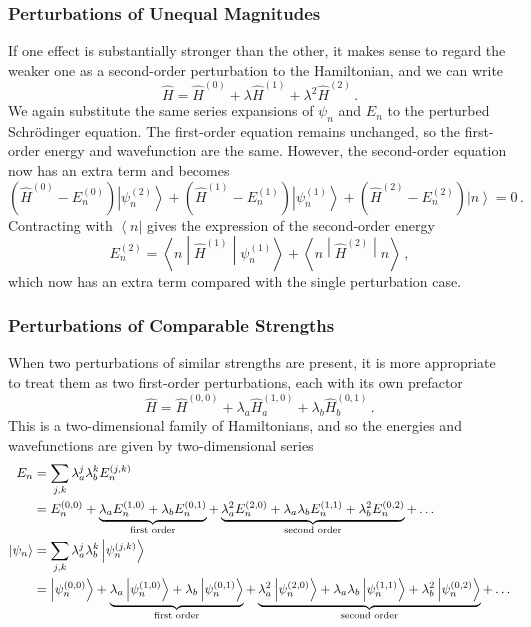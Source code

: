 \documentclass{article}
\theoremstyle{plain}\theoremheaderfont{\normalfont\itshape}\theorembodyfont{\rmfamily}\theoremseparator{.}\newtheorem*{rem}{Remark}\newtheorem*{ex}{Example}\newtheorem*{proof}{Proof}\newtheorem*{altp}{Alternative proof}
\theoremstyle{plain}\theoremheaderfont{\normalfont\bfseries}\theorembodyfont{\rmfamily}\theoremseparator{.}\newtheorem{thm}{Theorem}[section]\newtheorem{lem}[thm]{Lemma}\newtheorem{prop}[thm]{Proposition}\newtheorem*{cor}{Corollary}\newtheorem{defn}[thm]{Definition}\newtheorem{clm}[thm]{Claim}\newtheorem{clminproof}{Claim}
\theoremstyle{break}\theoremheaderfont{\normalfont\itshape}\theorembodyfont{\rmfamily}\theoremseparator{.\medskip}\newtheorem*{proofskip}{Proof}\newtheorem*{exs}{Examples}\newtheorem*{rems}{Remarks}
\theoremstyle{break}\theoremheaderfont{\normalfont\bfseries}\theorembodyfont{\rmfamily}\theoremseparator{.\medskip}\newtheorem{lemskip}[thm]{Lemma}\newtheorem{defnskip}[thm]{Definition}\newtheorem{propskip}[thm]{Proposition}\newtheorem{thmskip}[thm]{Theorem}
\numberwithin{equation}{section}
\newcommand{\bra}[1]{\left\langle #1 \right|}
\newcommand{\ket}[1]{\left| #1 \right\rangle}
\newcommand{\mel}[3]{\left\langle #1 \middle| #2 \middle| #3 \right\rangle}
\newcommand{\expval}[2]{\left\langle #2 \middle| #1 \middle| #2 \right\rangle}
\begin{document}
    \subsubsection{Perturbations of Unequal Magnitudes}
    If one effect is substantially stronger than the other, it makes sense to regard the weaker one as a second-order perturbation to the Hamiltonian, and we can write
    \begin{equation}
        \hat{H}=\hat{H}^{(0)}+\lambda\hat{H}^{(1)}+\lambda^2\hat{H}^{(2)}\,.
    \end{equation}
    We again substitute the same series expansions of \(\psi_n\) and \(E_n\) to the perturbed Schr\"{o}dinger equation. The first-order equation remains unchanged, so the first-order energy and wavefunction are the same. However, the second-order equation now has an extra term and becomes
    \begin{equation}
        (\hat{H}^{(0)}-E_n^{(0)})\ket{\psi_n^{(2)}}+(\hat{H}^{(1)}-E_n^{(1)})\ket{\psi_n^{(1)}}+(\hat{H}^{(2)}-E_n^{(2)})\ket{n}=0\,.
    \end{equation}
    Contracting with \(\bra{n}\) gives the expression of the second-order energy
    \begin{equation}
        E_n^{(2)}=\mel{n}{\hat{H}^{(1)}}{\psi_n^{(1)}}+\expval{\hat{H}^{(2)}}{n}\,,
    \end{equation}
    which now has an extra term compared with the single perturbation case.

    \subsubsection{Perturbations of Comparable Strengths}
    When two perturbations of similar strengths are present, it is more appropriate to treat them as two first-order perturbations, each with its own prefactor
    \begin{equation}
        \hat{H}=\hat{H}^{(0,0)}+\lambda_a\hat{H}_a^{(1,0)}+\lambda_b\hat{H}_b^{(0,1)}\,.
    \end{equation}
    This is a two-dimensional family of Hamiltonians, and so the energies and wavefunctions are given by two-dimensional series
    \begin{align}
        E_n&=\sum_{j,k}\lambda_a^j\lambda_b^k E_n^{(j,k)}\notag \\
        &=E_n^{(0,0)}+\underbrace{\lambda_a E_n^{(1,0)}+\lambda_b E_n^{(0,1)}}_{\text{first order}}+\underbrace{\lambda_a^2 E_n^{(2,0)}+\lambda_a\lambda_b E_n^{(1,1)}+\lambda_b^2 E_n^{(0,2)}}_{\text{second order}}+\dots\\
        \ket{\psi_n}&=\sum_{j,k}\lambda_a^j\lambda_b^k\ket{\psi_n^{(j,k)}}\notag\\
        &=\ket{\psi_n^{(0,0)}}+\underbrace{\lambda_a\ket{\psi_n^{(1,0)}}+\lambda_b\ket{\psi_n^{(0,1)}}}_{\text{first order}}+\underbrace{\lambda_a^2\ket{\psi_n^{(2,0)}}+\lambda_a\lambda_b\ket{\psi_n^{(1,1)}}+\lambda_b^2\ket{\psi_n^{(0,2)}}}_{\text{second order}}+\dots
    \end{align}
\end{document}
